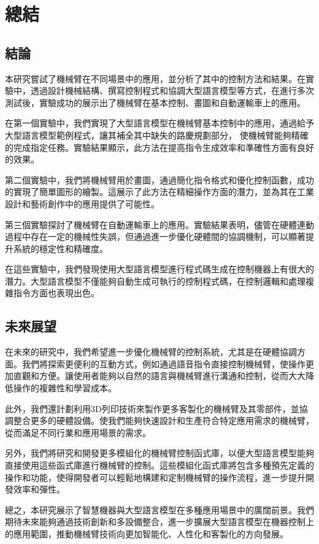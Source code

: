 \documentclass[class=NCU_thesis, crop=false]{standalone}
\begin{document}
\chapter{總結}

\section{結論}

本研究嘗試了機械臂在不同場景中的應用，並分析了其中的控制方法和結果。在實驗中，透過設計機械結構、撰寫控制程式和協調大型語言模型等方式，在進行多次測試後，實驗成功的展示出了機械臂在基本控制、畫圖和自動運輸車上的應用。

在第一個實驗中，我們實現了大型語言模型在機械臂基本控制中的應用，通過給予大型語言模型範例程式，讓其補全其中缺失的路慶規劃部分，
使機械臂能夠精確的完成指定任務。實驗結果顯示，此方法在提高指令生成效率和準確性方面有良好的效果。

第二個實驗中，我們將機械臂用於畫圖，通過簡化指令格式和優化控制函數，成功的實現了簡單圖形的繪製。這展示了此方法在精細操作方面的潛力，並為其在工業設計和藝術創作中的應用提供了可能性。

第三個實驗探討了機械臂在自動運輸車上的應用。實驗結果表明，儘管在硬體連動過程中存在一定的機械性失誤，但通過進一步優化硬體間的協調機制，可以顯著提升系統的穩定性和精確度。

在這些實驗中，我們發現使用大型語言模型進行程式碼生成在控制機器上有很大的潛力。大型語言模型不僅能夠自動生成可執行的控制程式碼，在控制邏輯和處理複雜指令方面也表現出色。
\section{未來展望}

在未來的研究中，我們希望進一步優化機械臂的控制系統，尤其是在硬體協調方面。我們將探索更便利的互動方式，例如通過語音指令直接控制機械臂，使操作更加直觀和方便。讓使用者能夠以自然的語言與機械臂進行溝通和控制，從而大大降低操作的複雜性和學習成本。

此外，我們還計劃利用3D列印技術來製作更多客製化的機械臂及其零部件，並協調整合更多的硬體設備。使我們能夠快速設計和生產符合特定應用需求的機械臂，從而滿足不同行業和應用場景的需求。

另外，我們將研究和開發更多模組化的機械臂控制函式庫，以便大型語言模型能夠直接使用這些函式庫進行機械臂的控制。這些模組化函式庫將包含多種預先定義的操作和功能，使得開發者可以輕鬆地構建和定制機械臂的操作流程，進一步提升開發效率和彈性。

總之，本研究展示了智慧機器與大型語言模型在多種應用場景中的廣闊前景。我們期待未來能夠通過技術創新和多設備整合，進一步擴展大型語言模型在機器控制上的應用範圍，推動機械臂技術向更加智能化、人性化和客製化的方向發展。
\end{document}
